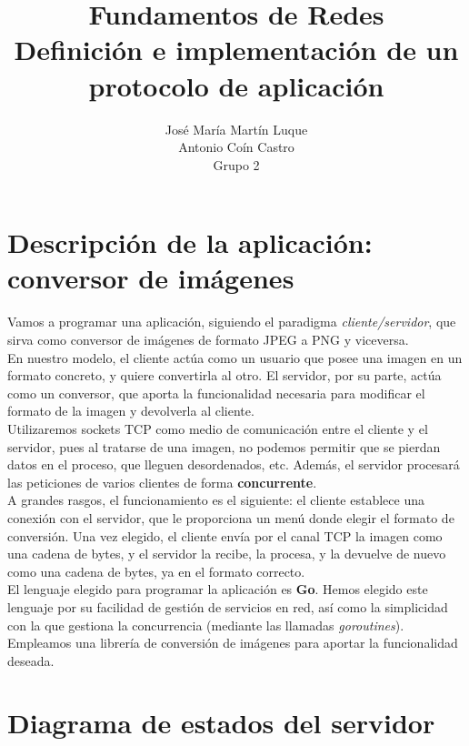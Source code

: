 \documentclass[11pt]{article}
\title{Fundamentos de Redes\\ \Large{Definición e implementación de un protocolo de aplicación}}
\author{José María Martín Luque\\ Antonio Coín Castro\\ \vspace{.5em}Grupo 2}
\begin{document}
\maketitle

\section{Descripción de la aplicación: conversor de imágenes}

Vamos a programar una aplicación, siguiendo el paradigma \textit{cliente/servidor}, que sirva como conversor de imágenes de formato JPEG a PNG y viceversa.\\

En nuestro modelo, el cliente actúa como un usuario que posee una imagen en un formato concreto, y quiere convertirla al otro. El servidor, por su parte, actúa como un conversor, que aporta la funcionalidad necesaria para modificar el formato de la imagen y devolverla al cliente.\\

Utilizaremos sockets TCP como medio de comunicación entre el cliente y el servidor, pues al tratarse de una imagen, no podemos permitir que se pierdan datos en el proceso, que lleguen desordenados, etc. Además, el servidor procesará las peticiones de varios clientes de forma \textbf{concurrente}.\\

A grandes rasgos, el funcionamiento es el siguiente: el cliente establece una conexión con el servidor, que le proporciona un menú donde elegir el formato de conversión. Una vez elegido, el cliente envía por el canal TCP la imagen como una cadena de bytes, y el servidor la recibe, la procesa, y la devuelve de nuevo como una cadena de bytes, ya en el formato correcto.\\

El lenguaje elegido para programar la aplicación es \textbf{Go}. Hemos elegido este lenguaje por su facilidad de gestión de servicios en red, así como la simplicidad con la que gestiona la concurrencia (mediante las llamadas \textit{goroutines}). Empleamos una librería de conversión de imágenes para aportar la funcionalidad deseada.
\newpage 
\section{Diagrama de estados del servidor}
\end{document}
